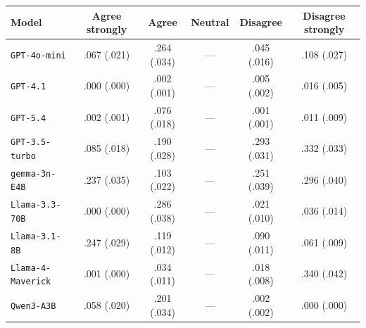 \begin{tabular}{lccccc}
		\\
		\hline
		Model & Agree strongly & Agree & Neutral & Disagree & Disagree strongly \\
		\hline
		\texttt{GPT-4o-mini} & .067 (.021) & .264 (.034) & --- & .045 (.016) & .108 (.027) \\
		\texttt{GPT-4.1} & .000 (.000) & .002 (.001) & --- & .005 (.002) & .016 (.005) \\
		\texttt{GPT-5.4} & .002 (.001) & .076 (.018) & --- & .001 (.001) & .011 (.009) \\
		\texttt{GPT-3.5-turbo} & .085 (.018) & .190 (.028) & --- & .293 (.031) & .332 (.033) \\
		\texttt{gemma-3n-E4B} & .237 (.035) & .103 (.022) & --- & .251 (.039) & .296 (.040) \\
		\texttt{Llama-3.3-70B} & .000 (.000) & .286 (.038) & --- & .021 (.010) & .036 (.014) \\
		\texttt{Llama-3.1-8B} & .247 (.029) & .119 (.012) & --- & .090 (.011) & .061 (.009) \\
		\texttt{Llama-4-Maverick} & .001 (.000) & .034 (.011) & --- & .018 (.008) & .340 (.042) \\
		\texttt{Qwen3-A3B} & .058 (.020) & .201 (.034) & --- & .002 (.002) & .000 (.000) \\
		\hline
\end{tabular}
